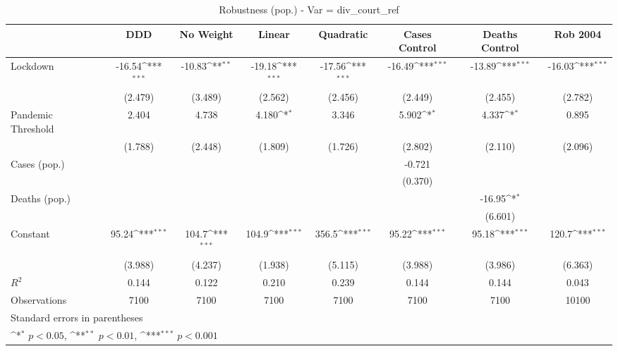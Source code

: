 \documentclass{article}
\begin{document}
{
\def\sym#1{\ifmmode^{#1}\else\(^{#1}\)\fi}
\begin{longtable}{l*{7}{c}}
\caption{Robustness (pop.) - Var = div\_court\_ref}\\
\hline\hline\endfirsthead\hline\endhead\hline\endfoot\endlastfoot
                &\multicolumn{1}{c}{DDD}&\multicolumn{1}{c}{No Weight}&\multicolumn{1}{c}{Linear}&\multicolumn{1}{c}{Quadratic}&\multicolumn{1}{c}{Cases Control}&\multicolumn{1}{c}{Deaths Control}&\multicolumn{1}{c}{Rob 2004}\\
\hline
Lockdown        &   -16.54\sym{***}&   -10.83\sym{**} &   -19.18\sym{***}&   -17.56\sym{***}&   -16.49\sym{***}&   -13.89\sym{***}&   -16.03\sym{***}\\
                &  (2.479)         &  (3.489)         &  (2.562)         &  (2.456)         &  (2.449)         &  (2.455)         &  (2.782)         \\
Pandemic Threshold&    2.404         &    4.738         &    4.180\sym{*}  &    3.346         &    5.902\sym{*}  &    4.337\sym{*}  &    0.895         \\
                &  (1.788)         &  (2.448)         &  (1.809)         &  (1.726)         &  (2.802)         &  (2.110)         &  (2.096)         \\
Cases (pop.)    &                  &                  &                  &                  &   -0.721         &                  &                  \\
                &                  &                  &                  &                  &  (0.370)         &                  &                  \\
Deaths (pop.)   &                  &                  &                  &                  &                  &   -16.95\sym{*}  &                  \\
                &                  &                  &                  &                  &                  &  (6.601)         &                  \\
Constant        &    95.24\sym{***}&    104.7\sym{***}&    104.9\sym{***}&    356.5\sym{***}&    95.22\sym{***}&    95.18\sym{***}&    120.7\sym{***}\\
                &  (3.988)         &  (4.237)         &  (1.938)         &  (5.115)         &  (3.988)         &  (3.986)         &  (6.363)         \\
\hline
\(R^{2}\)       &    0.144         &    0.122         &    0.210         &    0.239         &    0.144         &    0.144         &    0.043         \\
Observations    &     7100         &     7100         &     7100         &     7100         &     7100         &     7100         &    10100         \\
\hline\hline
\multicolumn{8}{l}{\footnotesize Standard errors in parentheses}\\
\multicolumn{8}{l}{\footnotesize \sym{*} \(p<0.05\), \sym{**} \(p<0.01\), \sym{***} \(p<0.001\)}\\
\end{longtable}
}
\end{document}
